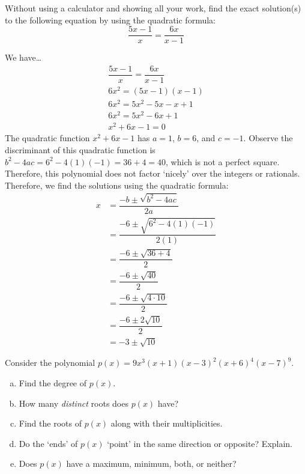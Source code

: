\documentclass[12pt,letterpaper]{exam}
\begin{document}
\begin{questions}
\newpage
\question[10] Without using a calculator and showing all your work, find the exact solution(s) to the following equation by using the quadratic formula:
	\[
	\dfrac{5x - 1}{x}= \dfrac{6x}{x - 1}
	\] \pspace

\sol We have\dots
	\[
	\begin{gathered}
	\dfrac{5x - 1}{x}= \dfrac{6x}{x - 1} \\[0.3cm]
	6x^2= (5x - 1)(x - 1) \\[0.3cm]
	6x^2= 5x^2 - 5x - x + 1 \\[0.3cm]
	6x^2= 5x^2 - 6x + 1 \\[0.3cm]
	x^2 + 6x - 1= 0
	\end{gathered}
	\]
The quadratic function $x^2 + 6x - 1$ has $a= 1$, $b= 6$, and $c= -1$. Observe the discriminant of this quadratic function is $b^2 - 4ac= 6^2 - 4(1)(-1)= 36 + 4= 40$, which is not a perfect square. Therefore, this polynomial does not factor `nicely' over the integers or rationals. Therefore, we find the solutions using the quadratic formula:
	\[
	\begin{aligned}
	x&= \dfrac{-b \pm \sqrt{b^2 - 4ac}}{2a} \\[0.3cm]
	&= \dfrac{-6 \pm \sqrt{6^2 - 4(1)(-1)}}{2(1)} \\[0.3cm]
	&= \dfrac{-6 \pm \sqrt{36 + 4}}{2} \\[0.3cm]
	&= \dfrac{-6 \pm \sqrt{40}}{2} \\[0.3cm]
	&= \dfrac{-6 \pm \sqrt{4 \cdot 10}}{2} \\[0.3cm]
	&= \dfrac{-6 \pm 2 \sqrt{10}}{2} \\[0.3cm]
	&= -3 \pm \sqrt{10}
	\end{aligned}
	\]



\newpage
\question[10] Consider the polynomial $p(x)= 9x^3 (x + 1) (x - 3)^2 (x + 6)^4 (x - 7)^9$.
	\begin{enumerate}[(a)]
	\item Find the degree of $p(x)$. 
	\item How many \textit{distinct} roots does $p(x)$ have?
	\item Find the roots of $p(x)$ along with their multiplicities. 
	\item Do the `ends' of $p(x)$ `point' in the same direction or opposite? Explain. 
	\item Does $p(x)$ have a maximum, minimum, both, or neither?
	\end{enumerate} \pspace


\end{questions}
\end{document}
